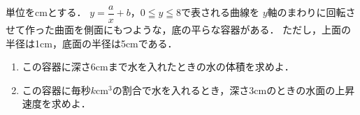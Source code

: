 \documentclass[../../main.tex]{subfiles}
\begin{document}
単位をcmとする．
$\displaystyle y=\dfrac{a}{x}+b$，$0 \leqq y \leqq 8$で表される曲線を
$y$軸のまわりに回転させて作った曲面を側面にもつような，底の平らな容器がある．
ただし，上面の半径は1cm，底面の半径は5cmである．
\begin{enumerate}
  \item この容器に深さ6cmまで水を入れたときの水の体積を求めよ．
  \item この容器に毎秒$k\text{cm}^3$の割合で水を入れるとき，深さ3cmのときの水面の上昇速度を求めよ．
\end{enumerate}
\end{document}
